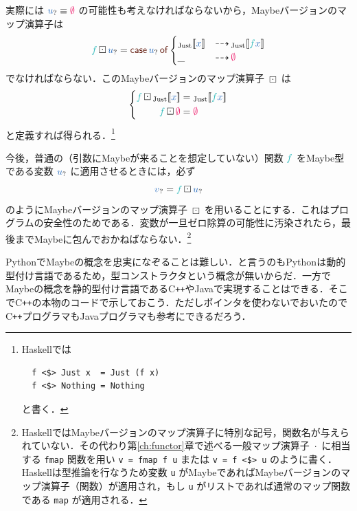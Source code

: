 \documentclass[a5paper,twoside,fleqn,draft]{jsbook}
\def\[{[\![}
\def\]{]\!]}
\def\constantColor{WildStrawberry}
\def\keywordColor{Sepia}
\def\varColor{NavyBlue}
\def\funcColor{BlueGreen}
\newcommand{\programminglanguage}[1]{\textsf{#1}}
\newcommand{\cxx}{\programminglanguage{C}\texttt{++}}
\newcommand{\haskell}{\programminglanguage{Haskell}}
\newcommand{\java}{\programminglanguage{Java}}
\newcommand{\python}{\programminglanguage{Python}}
\newcommand{\code}[1]{\texttt{#1}}
\newcommand{\mKeyword}[1]{\textcolor{\keywordColor}{\mathsf{#1}}}
\newcommand{\mCaseKeyword}{\mKeyword{case}}
\newcommand{\mOfKeyword}{\mKeyword{of}}
\DeclareMathOperator{\mCaseKW}{\mCaseKeyword}
\DeclareMathOperator{\mOfKW}{\mOfKeyword}
\newcommand{\mNothing}{\textcolor{\constantColor}{\emptyset}}
\newcommand{\mVar}[1]{\textcolor{\varColor}{#1}}
\newcommand{\mXVar}{\mVar{x}}
\newcommand{\mFunc}[1]{\textcolor{\funcColor}{#1}}
\newcommand{\mFFunc}{{\mFunc{f}}}
\DeclareMathOperator{\mIfSo}{\dashrightarrow}
\DeclareMathOperator{\mMap}{\cdot}
\DeclareMathOperator{\mMapMaybe}{\boxdot}
\newcommand{\mValueConstructor}[1]{\mathrm{#1}}
\newcommand{\mValueWith}[2]{{}_\mValueConstructor{#1}\[\mVar{#2}\]}
\newcommand{\mJustWith}[1]{\mValueWith{Just}{#1}}
\newcommand{\mMaybe}[1]{\mVar{#1}_?}
\newcommand{\mCaseOf}[1]{\mCaseKW#1\mOfKW}
\begin{document}
実際には $\mMaybe{u}\equiv\mNothing$ の可能性も考えなければならないから，Maybeバージョンのマップ演算子は
\begin{equation}
  \mFFunc\mMapMaybe\mMaybe{u}
  =\mCaseOf{\mMaybe{u}}
  \begin{cases}
    \mJustWith{x}
    &\mIfSo\mJustWith{\mFFunc\mXVar}\\
    \_
    &\mIfSo\mNothing
  \end{cases}
\end{equation}
でなければならない．このMaybeバージョンのマップ演算子 $\mMapMaybe$ は
\begin{equation}
  \left\{
  \begin{aligned}
    \mFFunc\mMapMaybe\mJustWith{x}
    &=\mJustWith{\mFFunc\mXVar}\\
    \mFFunc\mMapMaybe\mNothing
    &=\mNothing
  \end{aligned}
  \right.
\end{equation}
と定義すれば得られる．\footnote{\haskell では
\begin{verbatim}
  f <$> Just x  = Just (f x)
  f <$> Nothing = Nothing
\end{verbatim}
と書く．}

今後，普通の（引数にMaybeが来ることを想定していない）関数 $\mFFunc$ をMaybe型である変数 $\mMaybe{u}$ に適用させるときには，必ず
\begin{equation}
  \mMaybe{v}
  =\mFFunc\mMapMaybe\mMaybe{u}
\end{equation}
のようにMaybeバージョンのマップ演算子 $\mMapMaybe$ を用いることにする．これはプログラムの安全性のためである．変数が一旦ゼロ除算の可能性に汚染されたら，最後までMaybeに包んでおかねばならない．\footnote{\haskell ではMaybeバージョンのマップ演算子に特別な記号，関数名が与えられていない．その代わり第\ref{ch:functor}章で述べる一般マップ演算子 $\mMap$ に相当する \code{fmap} 関数を用い \code{v = fmap f u} または \code{v = f <\$> u} のように書く．\haskell は型推論を行なうため変数 \code{u} がMaybeであればMaybeバージョンのマップ演算子（関数）が適用され，もし \code{u} がリストであれば通常のマップ関数である \code{map} が適用される．}

\python でMaybeの概念を忠実になぞることは難しい．と言うのも\python は動的型付け言語であるため，型コンストラクタという概念が無いからだ．一方でMaybeの概念を静的型付け言語である\cxx や\java で実現することはできる．そこで\cxx の本物のコードで示しておこう．ただしポインタを使わないでおいたので\cxx プログラマも\java プログラマも参考にできるだろう．
\end{document}
